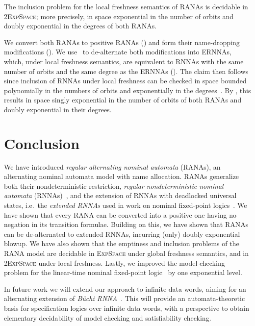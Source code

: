 \documentclass[10pt, final, conference, a4paper, twocolumn]{IEEEtran}
\newcommand{\EXPSPACE}{\textsc{ExpSpace}\xspace}
\begin{document}
\begin{theo}
  The inclusion problem for the local freshness semantics of RANAs is decidable
  in 2\EXPSPACE; more precisely, in space exponential in the number
  of orbits and doubly exponential in the degrees of both RANAs.
\end{theo}
\begin{IEEEproof}
  We convert both RANAs to positive RANAs
  ()
  and form their name-dropping modifications
  ().  We use~ to
  de-alternate both modifications into ERNNAs, which, under local
  freshness semantics, are equivalent to RNNAs with the same number of
  orbits and the same degree as the ERNNAs (\cite[Rem.~5.2]{hms21}). The
  claim then follows since %
  inclusion of RNNAs under local
  freshness can be checked in space bounded polynomially in the numbers
  of orbits and exponentially in the degrees~\cite[Cor.~7.4]{skmw17}. By
  , this results in space singly
  exponential in the number of orbits of both RANAs and doubly
  exponential in their degrees.
\end{IEEEproof}



\section{Conclusion}\label{sec:concl}

We have introduced \emph{regular alternating nominal automata}
  (RANAs), an alternating nominal automata model with name
allocation. RANAs generalize both their nondeterministic restriction,
\emph{regular nondeterministic nominal automata} (\mbox{RNNAs})~\cite{skmw17}, and the extension of RNNAs with deadlocked
universal states, i.e.~the \emph{extended RNNAs }used in work on
nominal fixed-point logics~\cite{hms21}.  We have shown that every
RANA can be converted into a positive one having no negation in its
transition formulae. Building on this, we have shown that
RANAs can be de-alternated to extended RNNAs, incurring (only)
doubly exponential blowup.  We have also shown that the emptiness and
inclusion problems of the RANA model are decidable in
\EXPSPACE under global freshness semantics, and in
2\EXPSPACE under local freshness. Lastly, we improved the
model-checking problem for the linear-time nominal fixed-point logic
\muBar~by one exponential level.

In future work we will extend our approach to infinite data words, aiming for an
alternating extension of \emph{Büchi RNNA}~\cite{uhms21}. This will provide an
automata-theoretic basis for specification logics over infinite data words, with a perspective to
obtain elementary decidability of model checking and satisfiability checking.
\end{document}
